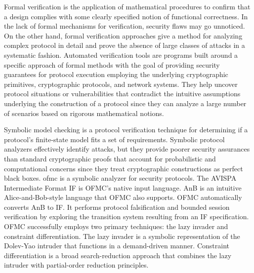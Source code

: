 Formal verification is the application of mathematical procedures to confirm that a design complies with some clearly specified notion of functional correctness. In the lack of formal mechanisms for verification, security flaws may go unnoticed. On the other hand, formal verification approaches give a method for analyzing complex protocol in detail and prove the absence of large classes of attacks in a systematic fashion. Automated verification tools are programs built around a specific approach of formal methods with the goal of providing security guarantees for protocol execution employing the underlying cryptographic primitives, cryptographic protocols, and network systems. They help uncover protocol situations or vulnerabilities that contradict the intuitive assumptions underlying the construction of a protocol since they can analyze a large number of scenarios based on rigorous mathematical notions.
\par
Symbolic model checking is a protocol verification technique for determining if a protocol's finite-state model fits a set of requirements. Symbolic protocol analyzers effectively identify attacks, but they provide poorer security assurances than standard cryptographic proofs that account for probabilistic and computational concerns since they treat cryptographic constructions as perfect black boxes. \gls{ofmc} \cite{ofmc} is a symbolic analyzer for security protocols. The AVISPA Intermediate Format IF \cite{avispa} is OFMC's native input language. AnB \cite{AnB} is an intuitive Alice-and-Bob-style language that OFMC also supports. OFMC automatically converts AnB to IF. It performs protocol falsification and bounded session verification by exploring the transition system resulting from an IF specification. OFMC successfully employs two primary techniques: the lazy invader and constraint differentiation. The lazy invader is a symbolic representation of the Dolev-Yao intruder \cite{dolev1983security} that functions in a demand-driven manner. Constraint differentiation is a broad search-reduction approach that combines the lazy intruder with partial-order reduction principles.